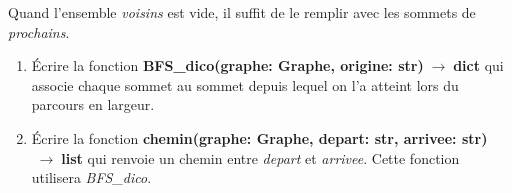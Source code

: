\documentclass[a4paper,11pt]{article}
\begin{document}
\begin{Form}
\begin{exo}
\begin{itemize}
\end{itemize}
Quand l'ensemble \emph{voisins} est vide, il suffit de le remplir avec les sommets de \emph{prochains}.
\begin{enumerate}
\item Écrire la fonction \textbf{BFS\_dico(graphe: Graphe, origine: str)$\;\rightarrow\;$dict} qui associe chaque sommet au sommet depuis lequel on l'a atteint lors du parcours en largeur.
\item Écrire la fonction \textbf{chemin(graphe: Graphe, depart: str, arrivee: str)$\;\rightarrow\;$list} qui renvoie un chemin entre \emph{depart} et \emph{arrivee}. Cette fonction utilisera \emph{BFS\_dico}.
\end{enumerate}
\end{exo}
\end{Form}
\end{document}
